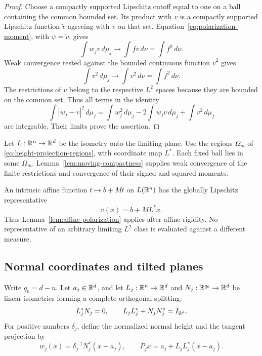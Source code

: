 \begin{proof}
Choose a compactly supported Lipschitz cutoff equal to one on a ball
containing the common bounded set. Its product with $v$ is a compactly
supported Lipschitz function $\widetilde v$ agreeing with $v$ on that
set. Equation~\eqref{eq:polarization-moment}, with
$\psi=\widetilde v$, gives
\[
 \int w_jv\,d\mu_j\longrightarrow
 \int fv\,d\nu=\int f^2\,d\nu.
\]
Weak convergence tested against the bounded continuous function
$\widetilde v^2$ gives
\[
 \int v^2\,d\mu_j\longrightarrow
 \int v^2\,d\nu=\int f^2\,d\nu.
\]
The restrictions of $v$ belong to the respective $L^2$ spaces because
they are bounded on the common set. Thus all terms in the identity
\[
 \int|w_j-v|^2\,d\mu_j
 =\int w_j^2\,d\mu_j-2\int w_jv\,d\mu_j
       +\int v^2\,d\mu_j
\]
are integrable. Their limits prove the assertion.
\end{proof}

Let $L:\mathbb R^n\to\mathbb R^d$ be the isometry onto the limiting plane.
Use the regions $\Omega_m$ of \eqref{eq:height-projection-regions},
with coordinate map $L^*$. Each fixed ball lies in some $\Omega_m$.
Lemma~\ref{lem:moving-compactness} supplies weak convergence of the
finite restrictions and convergence of their signed and squared moments.

An intrinsic affine function $t\mapsto b+Mt$ on $L(\mathbb R^n)$ has the
globally Lipschitz representative
\begin{equation}\label{eq:ambient-affine-representative}
 v(x)=b+ML^*x.
\end{equation}
Thus Lemma~\ref{lem:affine-polarization} applies after affine rigidity.
No representative of an arbitrary limiting $L^2$ class is evaluated
against a different measure.

\subsection{Normal coordinates and tilted planes}

Write $q_0=d-n$. Let $a_j\in\mathbb R^d$, and let
$L_j:\mathbb R^n\to\mathbb R^d$ and $N_j:\mathbb R^{q_0}\to\mathbb R^d$ be linear isometries
forming a complete orthogonal splitting:
\begin{equation}\label{eq:complete-normal-splitting}
 L_j^*N_j=0,\qquad L_jL_j^*+N_jN_j^*=I_{\mathbb R^d}.
\end{equation}
For positive numbers $\delta_j$, define the normalized normal height
and the tangent projection by
\begin{equation}\label{eq:normalized-vector-height}
 w_j(x)=\delta_j^{-1}N_j^*(x-a_j),\qquad
 P_jx=a_j+L_jL_j^*(x-a_j).
\end{equation}

